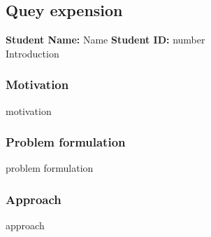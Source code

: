\subsection{Quey expension}
\textbf{Student Name: }Name \textbf{Student ID:} number\\
Introduction
\subsubsection*{Motivation}
motivation
\subsubsection*{Problem formulation}
problem formulation
\subsubsection*{Approach}
approach
